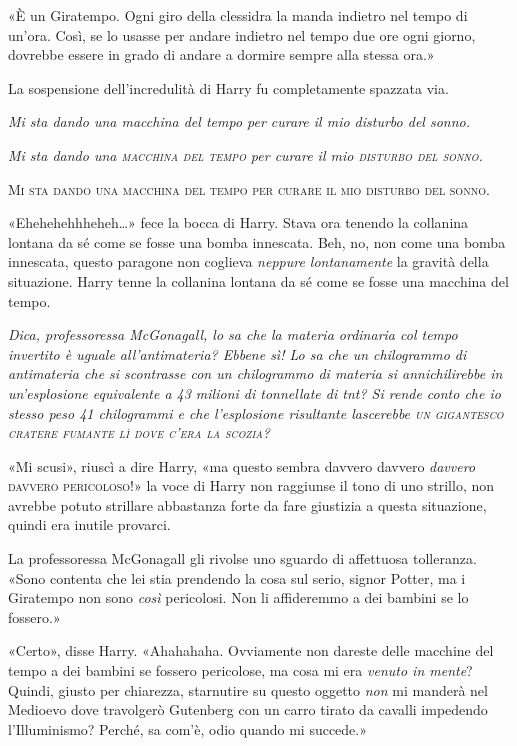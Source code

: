 «È un Giratempo. Ogni giro della clessidra la manda indietro nel tempo di un’ora. Così, se lo usasse per andare indietro nel tempo due ore ogni giorno, dovrebbe essere in grado di andare a dormire sempre alla stessa ora.»

La sospensione dell’incredulità di Harry fu completamente spazzata via.

\textit{Mi sta dando una macchina del tempo per curare il mio disturbo del sonno.}

\textit{Mi sta dando una \textsc{macchina del tempo} per curare il mio \textsc{disturbo del sonno.}}

\textsc{Mi sta dando una macchina del tempo per curare il mio disturbo del sonno.}

«Ehehehehhheheh…» fece la bocca di Harry. Stava ora tenendo la collanina lontana da sé come se fosse una bomba innescata. Beh, no, non come una bomba innescata, questo paragone non coglieva \textit{neppure lontanamente} la gravità della situazione. Harry tenne la collanina lontana da sé come se fosse una macchina del tempo.

\textit{Dica, professoressa McGonagall, lo sa che la materia ordinaria col tempo invertito è uguale all’antimateria? Ebbene sì! Lo sa che un chilogrammo di antimateria che si scontrasse con un chilogrammo di materia si annichilirebbe in un’esplosione equivalente a 43 milioni di tonnellate di tnt? Si rende conto che io stesso peso 41 chilogrammi e che l’esplosione risultante lascerebbe \textsc{un gigantesco cratere fumante lì dove c’era la scozia?}}

«Mi scusi», riuscì a dire Harry, «ma questo sembra davvero davvero \textit{davvero} \textsc{davvero pericoloso}!» la voce di Harry non raggiunse il tono di uno strillo, non avrebbe potuto strillare abbastanza forte da fare giustizia a questa situazione, quindi era inutile provarci.

La professoressa McGonagall gli rivolse uno sguardo di affettuosa tolleranza. «Sono contenta che lei stia prendendo la cosa sul serio, signor Potter, ma i Giratempo non sono \textit{così} pericolosi. Non li affideremmo a dei bambini se lo fossero.»

«Certo», disse Harry. «Ahahahaha. Ovviamente non dareste delle macchine del tempo a dei bambini se fossero pericolose, ma cosa mi era \textit{venuto in mente}? Quindi, giusto per chiarezza, starnutire su questo oggetto \textit{non} mi manderà nel Medioevo dove travolgerò Gutenberg con un carro tirato da cavalli impedendo l’Illuminismo? Perché, sa com’è, odio quando mi succede.»

